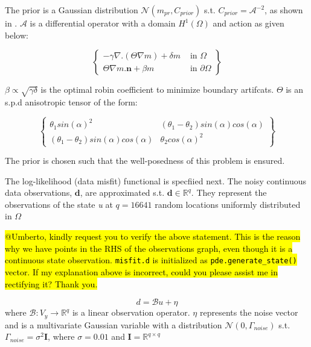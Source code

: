 The prior is a Gaussian distribution $\mathcal{N}(m_{pr}, C_{prior})$ s.t. $C_{prior} = \mathcal{A}^{-2}$, as shown in \cite{stuart2010inverse}. $\mathcal{A}$ is a differential operator with a domain $H^1({\Omega})$ and action as given below:

\begin{equation}
\label{eqn: prior_action}
 \left\{
    \begin{array}{lr}
        -\gamma\nabla.(\Theta\nabla{m}) + \delta{m} &  \textrm{ in } \Omega\\
        \Theta\nabla{m}.\textbf{n} + \beta{m} & \textrm{ in } \partial\Omega
    \end{array}
\right\}
\end{equation}

$\beta \propto \sqrt{\gamma\delta}$ is the optimal robin coefficient \cite{daon2016mitigating} to minimize boundary artifcats. $\Theta$ is an s.p.d anisotropic tensor of the form:

\begin{equation}
\label{eqn: Theta}
 \left\{
    \begin{array}{lr}
        \theta_1sin(\alpha)^2 &  (\theta_1 - \theta_2)sin(\alpha)cos(\alpha)\\
        (\theta_1 - \theta_2)sin(\alpha)cos(\alpha) & \theta_2cos(\alpha)^2
    \end{array}
\right\}
\end{equation}

The prior is chosen such that the well-posedness of this problem is ensured.

The log-likelihood (data misfit) functional is specfiied next. The noisy continuous data observations, $\textbf{d}$, are approximated s.t. $\textbf{d} \in \mathbb{R}^q$. They represent the observations of the state \textit{u} at $q = 16641$ random locations uniformly distributed in $\Omega$ 

\hl{@Umberto, kindly request you to verify the above statement. This is the reason why we have points in the RHS of the observations graph, even though it is a continuous state observation. \texttt{misfit.d} is initialized as \texttt{pde.generate\_state()} vector. If my explanation above is incorrect, could you please assist me in rectifying it? Thank you.}

\begin{equation}
    d = \mathcal{B}u + \eta
\end{equation}
where $\mathcal{B} : V_y \rightarrow \mathbb{R}^q$ is a linear observation operator. $\eta$ represents the noise vector and is a multivariate Gaussian variable with a distribution $\mathcal{N}(0, \Gamma_{noise})$ s.t. $\Gamma_{noise} = \sigma^2\textbf{I}$, where $\sigma = 0.01$ and $\textbf{I} = \mathbb{R}^{q \times q}$

